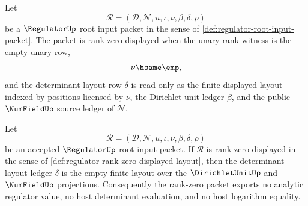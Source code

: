 \begin{definition}
\label{def:regulator-rank-zero-displayed-layout}
Let
$$
\mathcal{R}=(\mathcal{D},\mathcal{N},u,\iota,\nu,\beta,\delta,\rho)
$$
be a $\RegulatorUp$ root input packet in the sense of
\autoref{def:regulator-root-input-packet}. The packet is rank-zero displayed
when the unary rank witness is the empty unary row,
$$
\nu\hsame\emp,
$$
and the determinant-layout row $\delta$ is read only as the finite displayed
layout indexed by positions licensed by $\nu$, the Dirichlet-unit ledger
$\beta$, and the public $\NumFieldUp$ source ledger of $\mathcal{N}$.
\end{definition}

\begin{theorem}
\label{thm:regulator-rank-zero-layout-degeneracy}
Let
$$
\mathcal{R}=(\mathcal{D},\mathcal{N},u,\iota,\nu,\beta,\delta,\rho)
$$
be an accepted $\RegulatorUp$ root input packet. If $\mathcal{R}$ is rank-zero
displayed in the sense of
\autoref{def:regulator-rank-zero-displayed-layout}, then the determinant-layout
ledger $\delta$ is the empty finite layout over the
$\DirichletUnitUp$ and $\NumFieldUp$ projections. Consequently the rank-zero
packet exports no analytic regulator value, no host determinant evaluation,
and no host logarithm equality.
\end{theorem}
